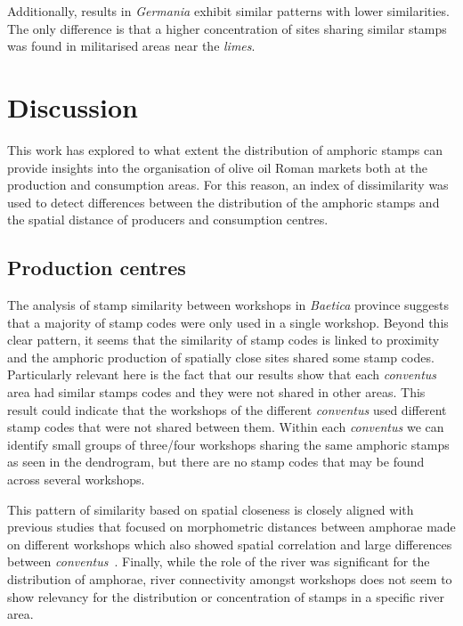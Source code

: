 Additionally, results in \textit{Germania} exhibit similar patterns with lower similarities. The only difference is that a higher concentration of sites sharing similar stamps was found in militarised areas near the \textit{limes}.


\section{Discussion}
\label{sec:7}

This work has explored to what extent the distribution of amphoric stamps can provide insights into the organisation of olive oil Roman markets both at the production and consumption areas. For this reason, an index of dissimilarity was used to detect differences between the distribution of the amphoric stamps and the spatial distance of producers and consumption centres. 

\subsection{Production centres}
\label{sec:7}

The analysis of stamp similarity between workshops in \textit{Baetica} province suggests that a majority of stamp codes were only used in a single workshop. Beyond this clear pattern, it seems that the similarity of stamp codes is linked to proximity and the amphoric production of spatially close sites shared some stamp codes. Particularly relevant here is the fact that our results show that each \textit{conventus} area had similar stamps codes and they were not shared in other areas. This result could indicate that the workshops of the different \textit{conventus} used different stamp codes that were not shared between them. Within each \textit{conventus} we can identify small groups of three/four workshops sharing the same amphoric stamps as seen in the dendrogram, but there are no stamp codes that may be found across several workshops. 

This pattern of similarity based on spatial closeness is closely aligned with previous studies that focused on morphometric distances between amphorae made on different workshops which also showed spatial correlation and large differences between \textit{conventus}~\citep{coto-sarmiento_identifying_2018}. Finally, while the role of the river was significant for the distribution of amphorae, river connectivity amongst workshops does not seem to show relevancy for the distribution or concentration of stamps in a specific river area.

